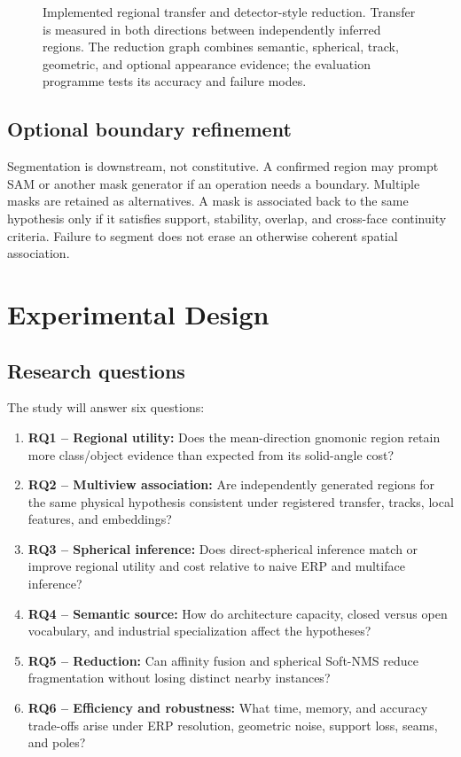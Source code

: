 \documentclass[a4paper,9pt]{extarticle}
\begin{document}
\begin{figure}[t]
\caption{Implemented regional transfer and detector-style reduction. Transfer is measured in both directions between independently inferred regions. The reduction graph combines semantic, spherical, track, geometric, and optional appearance evidence; the evaluation programme tests its accuracy and failure modes.}
\label{fig:transfer}
\end{figure}

\subsection{Optional boundary refinement}

Segmentation is downstream, not constitutive. A confirmed region may prompt SAM or another mask generator if an operation needs a boundary. Multiple masks are retained as alternatives. A mask is associated back to the same hypothesis only if it satisfies support, stability, overlap, and cross-face continuity criteria. Failure to segment does not erase an otherwise coherent spatial association.

\section{Experimental Design}

\subsection{Research questions}

The study will answer six questions:
\begin{enumerate}
 \item \textbf{RQ1 -- Regional utility:} Does the mean-direction gnomonic region retain more class/object evidence than expected from its solid-angle cost?
 \item \textbf{RQ2 -- Multiview association:} Are independently generated regions for the same physical hypothesis consistent under registered transfer, tracks, local features, and embeddings?
 \item \textbf{RQ3 -- Spherical inference:} Does direct-spherical inference match or improve regional utility and cost relative to naive ERP and multiface inference?
 \item \textbf{RQ4 -- Semantic source:} How do architecture capacity, closed versus open vocabulary, and industrial specialization affect the hypotheses?
 \item \textbf{RQ5 -- Reduction:} Can affinity fusion and spherical Soft-NMS reduce fragmentation without losing distinct nearby instances?
 \item \textbf{RQ6 -- Efficiency and robustness:} What time, memory, and accuracy trade-offs arise under ERP resolution, geometric noise, support loss, seams, and poles?
\end{enumerate}
\end{document}
